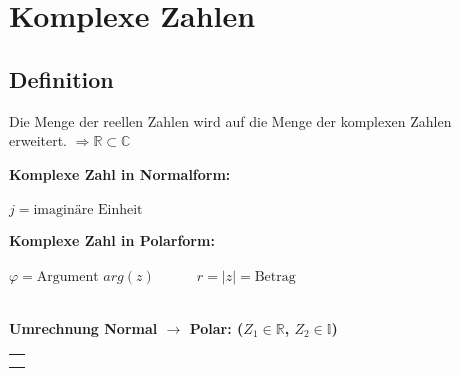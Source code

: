 \section{Komplexe Zahlen}
	\subsection{Definition}
		Die Menge der reellen Zahlen wird auf die Menge der komplexen Zahlen erweitert. $\Rightarrow \mathbb{R} \subset \mathbb{C}$\\
		
		\begin{minipage}[t]{0.5\textwidth}
			\textbf{Komplexe Zahl in Normalform:}\\[3pt]
			\\[3pt]
			$j = \text{imaginäre Einheit}$
		\end{minipage}
		\begin{minipage}[t]{0.5\textwidth}
			\textbf{Komplexe Zahl in Polarform:}\\[3pt]
			\\[3pt]
			$\varphi = \text{Argument } arg(z) \quad\qquad r = \left| z \right| = \text{Betrag}$
		\end{minipage}\\[3pt]
		\textbf{Umrechnung Normal $\rightarrow$ Polar: ($Z_1 \in \mathbb{R}$, $Z_2 \in \mathbb{I}$)}\\
		\begin{tabular}{l}
			\fbox{$\displaystyle |z| = r = \sqrt{z_{1}^2 + z_{2}^2}$}\\[6pt]
			\fbox{$\displaystyle |z| = r = \sqrt{z \cdot \overline{z}}$}\\[6pt]
		\end{tabular}
		\\[3pt]
